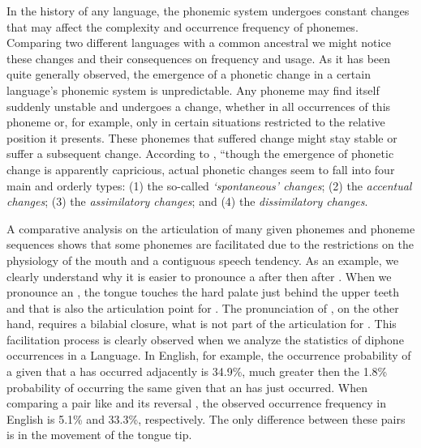 In the history of any language, the phonemic system undergoes constant changes that may affect the complexity and occurrence frequency of phonemes. Comparing two different languages with a common ancestral we might notice these changes and their consequences on frequency and usage. As it has been quite generally observed, the emergence of a phonetic change in a certain language's phonemic system is unpredictable. Any phoneme may find itself suddenly unstable and undergoes a change, whether in all occurrences of this phoneme or, for example, only in certain situations restricted to the relative position it presents. These phonemes that suffered change might stay stable or suffer a subsequent change.	According to \cite{zipf1949}, ``though the emergence of phonetic change is apparently capricious, actual phonetic changes seem to fall into four main and orderly types: (1) the so-called \textit{`spontaneous' changes}; (2) the \textit{accentual changes}; (3) the \textit{assimilatory changes}; and (4) the \textit{dissimilatory changes}.

A comparative analysis on the articulation of many given phonemes and phoneme sequences shows that some phonemes are facilitated due to the restrictions on the physiology of the mouth and a contiguous speech tendency. As an example, we clearly understand why it is easier to pronounce a \textipa{[d]} after \textipa{[n]} then after \textipa{[m]}. When we pronounce an \textipa{[n]}, the tongue touches the hard palate just behind the upper teeth and that is also the articulation point for \textipa{[d]}. The pronunciation of \textipa{[m]}, on the other hand, requires a bilabial closure, what is not part of the articulation for \textipa{[d]}. This facilitation process is clearly observed when we analyze the statistics of diphone occurrences in a Language. In English, for example, the occurrence probability of a \textipa{[d]} given that a \textipa{[n]} has occurred adjacently is 34.9\%, much greater then the 1.8\% probability of occurring the same \textipa{[d]} given that an \textipa{[m]} has just occurred. When comparing a pair like \textipa{[ts]} and its reversal \textipa{[st]}, the observed occurrence frequency in English is 5.1\% and 33.3\%, respectively. The only difference between these pairs is in the movement of the tongue tip.

